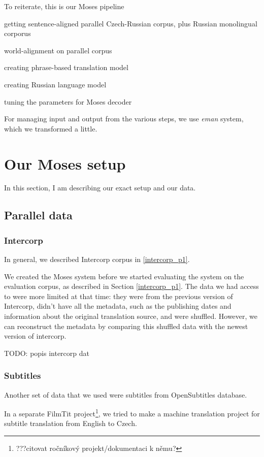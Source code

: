 To reiterate, this is our Moses pipeline
\begin{pitemize}
\item getting sentence-aligned parallel Czech-Russian corpus, plus Russian monolingual corporus
\item world-alignment on parallel corpus
\item creating phrase-based translation model
\item creating Russian language model
\item tuning the parameters for Moses decoder
\end{pitemize}

For managing input and output from the various steps, we use \emph{eman} system, which we transformed a little.


\section{Our Moses setup}
In this section, I am describing our exact setup and our data.

\subsection{Parallel data}
\subsubsection{Intercorp}
In general, we described Intercorp corpus in \ref{intercorp_p1}.


We created the Moses system before we started evaluating the system on the evaluation corpus, as described in Section \ref{intercorp_p1}. 
The data we had access to were more limited at that time: they were from the previous version of Intercorp, didn't have all the metadata, such as the publishing dates and information about the original translation source, and were shuffled. However, we can reconstruct the metadata by comparing this shuffled data with the newest version of intercorp.


TODO: popis intercorp dat

\subsubsection{Subtitles}
Another set of data that we used were subtitles from OpenSubtitles database.

In a separate FilmTit project\footnote{???citovat ročníkový projekt/dokumentaci k němu?}, we tried to make a machine translation project for subtitle translation from English to Czech.

